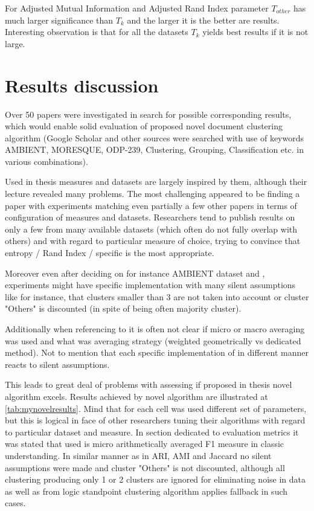 \documentclass[a4paper, 12pt, oneside]{Thesis} %
\begin{document}
For Adjusted Mutual Information and Adjusted Rand Index parameter $T_{other}$ has much larger significance than $T_k$ and the larger it is the better are results. Interesting observation is that for all the datasets $T_k$ yields best results if it is not large.

\section{Results discussion} Over 50 papers were investigated in search for possible corresponding results, which would enable solid evaluation of proposed novel document clustering algorithm (Google Scholar and other sources were searched with use of keywords AMBIENT, MORESQUE, ODP-239, Clustering, Grouping, Classification etc. in various combinations).

Used in thesis measures and datasets are largely inspired by them, although their lecture revealed many problems. The most challenging appeared to be finding a paper with experiments matching even partially a few other papers in terms of configuration of measures and datasets. Researchers tend to publish results on only a few from many available datasets (which often do not fully overlap with others) and with regard to particular measure of choice, trying to convince that entropy / Rand Index / specific  is the most appropriate.

Moreover even after deciding on for instance AMBIENT dataset and , experiments might have specific implementation with many silent assumptions like for instance, that clusters smaller than 3 are not taken into account or cluster "Others" is discounted (in spite of being often majority cluster). 

Additionally when referencing to  it is often not clear if micro or macro averaging was used and what was averaging strategy (weighted geometrically vs dedicated method). Not to mention that each  specific implementation of  in different manner reacts to silent assumptions.  

This leads to great deal of problems with assessing if proposed in thesis novel algorithm excels. Results achieved by novel algorithm are illustrated at \ref{tab:mynovelresults}. Mind that for each cell was used different set of parameters, but this is logical in face of other researchers tuning their algorithms with regard to particular dataset and measure. 
In section dedicated to evaluation metrics it was stated that  used is micro arithmetically averaged F1 measure in classic understanding. In similar manner as in ARI, AMI and Jaccard no silent assumptions were made and cluster "Others" is not discounted, although all clustering producing only 1 or 2 clusters are ignored for eliminating noise in data as well as from logic standpoint clustering algorithm applies fallback in such cases.
\end{document}
